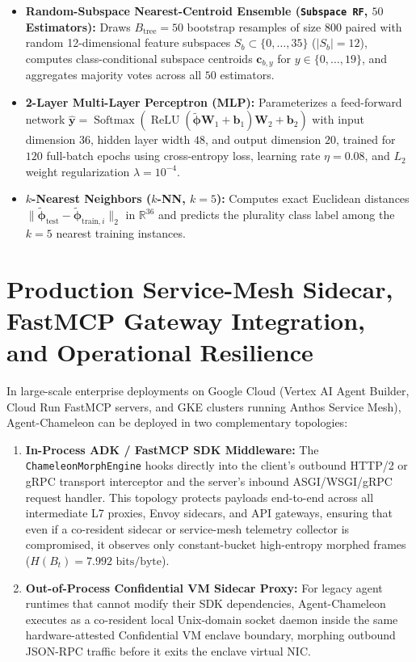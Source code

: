 \documentclass[conference,10pt]{IEEEtran}
\begin{document}
\begin{itemize}
    \item \textbf{Random-Subspace Nearest-Centroid Ensemble (\texttt{Subspace RF}, $50$ Estimators):} Draws $B_{\text{tree}} = 50$ bootstrap resamples of size $800$ paired with random 12-dimensional feature subspaces $S_b \subset \{0,\dots,35\}$ ($|S_b| = 12$), computes class-conditional subspace centroids $\mathbf{c}_{b, y}$ for $y \in \{0,\dots,19\}$, and aggregates majority votes across all $50$ estimators.
    \item \textbf{2-Layer Multi-Layer Perceptron (MLP):} Parameterizes a feed-forward network $\hat{\mathbf{y}} = \operatorname{Softmax}(\operatorname{ReLU}(\tilde{\boldsymbol{\phi}} \mathbf{W}_1 + \mathbf{b}_1)\mathbf{W}_2 + \mathbf{b}_2)$ with input dimension $36$, hidden layer width $48$, and output dimension $20$, trained for $120$ full-batch epochs using cross-entropy loss, learning rate $\eta = 0.08$, and $L_2$ weight regularization $\lambda = 10^{-4}$.
    \item \textbf{$k$-Nearest Neighbors ($k$-NN, $k = 5$):} Computes exact Euclidean distances $\|\tilde{\boldsymbol{\phi}}_{\text{test}} - \tilde{\boldsymbol{\phi}}_{\text{train}, i}\|_2$ in $\mathbb{R}^{36}$ and predicts the plurality class label among the $k = 5$ nearest training instances.
\end{itemize}

\section{Production Service-Mesh Sidecar, FastMCP Gateway Integration, and Operational Resilience}
\label{app:deployment}

In large-scale enterprise deployments on Google Cloud (Vertex AI Agent Builder, Cloud Run FastMCP servers, and GKE clusters running Anthos Service Mesh), Agent-Chameleon can be deployed in two complementary topologies:
\begin{enumerate}
    \item \textbf{In-Process ADK / FastMCP SDK Middleware:} The \texttt{ChameleonMorphEngine} hooks directly into the client's outbound HTTP/2 or gRPC transport interceptor and the server's inbound ASGI/WSGI/gRPC request handler. This topology protects payloads end-to-end across all intermediate L7 proxies, Envoy sidecars, and API gateways, ensuring that even if a co-resident sidecar or service-mesh telemetry collector is compromised, it observes only constant-bucket high-entropy morphed frames ($H(B_t) = 7.992\text{ bits/byte}$).
    \item \textbf{Out-of-Process Confidential VM Sidecar Proxy:} For legacy agent runtimes that cannot modify their SDK dependencies, Agent-Chameleon executes as a co-resident local Unix-domain socket daemon inside the same hardware-attested Confidential VM enclave boundary, morphing outbound JSON-RPC traffic before it exits the enclave virtual NIC.
\end{enumerate}
\end{document}
